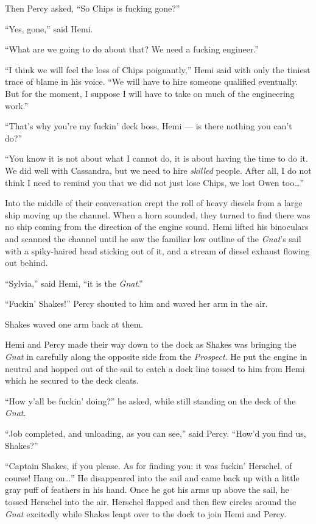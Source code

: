 \documentclass[
]{scrbook}
\begin{document}
Then Percy asked, ``So Chips is fucking gone?''

``Yes, gone,'' said Hemi.

``What are we going to do about that? We need a fucking engineer.''

``I think we will feel the loss of Chips poignantly,'' Hemi said with
only the tiniest trace of blame in his voice. ``We will have to hire
someone qualified eventually. But for the moment, I suppose I will have
to take on much of the engineering work.''

``That's why you're my fuckin' deck boss, Hemi --- is there nothing you
can't do?''

``You know it is not about what I cannot do, it is about having the time
to do it. We did well with Cassandra, but we need to hire \emph{skilled}
people. After all, I do not think I need to remind you that we did not
just lose Chips, we lost Owen too\ldots{}''

Into the middle of their conversation crept the roll of heavy diesels
from a large ship moving up the channel. When a horn sounded, they
turned to find there was no ship coming from the direction of the engine
sound. Hemi lifted his binoculars and scanned the channel until he saw
the familiar low outline of the \emph{Gnat}'s sail with a spiky-haired
head sticking out of it, and a stream of diesel exhaust flowing out
behind.

``Sylvia,'' said Hemi, ``it is the \emph{Gnat}.''

``Fuckin' Shakes!'' Percy shouted to him and waved her arm in the air.

Shakes waved one arm back at them.

Hemi and Percy made their way down to the dock as Shakes was bringing
the \emph{Gnat} in carefully along the opposite side from the
\emph{Prospect}. He put the engine in neutral and hopped out of the sail
to catch a dock line tossed to him from Hemi which he secured to the
deck cleats.

``How y'all be fuckin' doing?'' he asked, while still standing on the
deck of the \emph{Gnat}.

``Job completed, and unloading, as you can see,'' said Percy. ``How'd
you find us, Shakes?''

``Captain Shakes, if you please. As for finding you: it was fuckin'
Herschel, of course! Hang on\ldots{}'' He disappeared into the sail and
came back up with a little gray puff of feathers in his hand. Once he
got his arms up above the sail, he tossed Herschel into the air.
Herschel flapped and then flew circles around the \emph{Gnat} excitedly
while Shakes leapt over to the dock to join Hemi and Percy.
\end{document}
